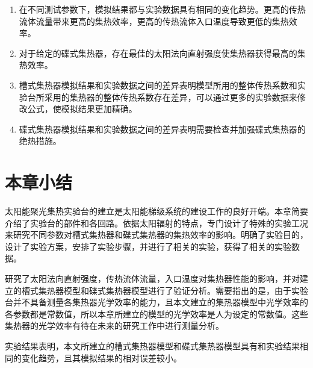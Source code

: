 \begin{enumerate}[label=(\arabic*)]
\item 在不同测试参数下，模拟结果都与实验数据具有相同的变化趋势。更高的传热流体流量带来更高的集热效率，更高的传热流体入口温度导致更低的集热效率。
\item 对于给定的碟式集热器，存在最佳的太阳法向直射强度使集热器获得最高的集热效率。
\item 槽式集热器模拟结果和实验数据之间的差异表明模型所用的整体传热系数和实验台所采用的集热器的整体传热系数存在差异，可以通过更多的实验数据来修改公式，使模拟结果更加精确。
\item 碟式集热器模拟结果和实验数据之间的差异表明需要检查并加强碟式集热器的绝热措施。
\end{enumerate}

\section{本章小结}
太阳能聚光集热实验台的建立是太阳能梯级系统的建设工作的良好开端。本章简要介绍了实验台的部件和各回路。依据太阳辐射的特点，专门设计了特殊的实验工况来研究不同参数对槽式集热器和碟式集热器的集热效率的影响。明确了实验目的，设计了实验方案，安排了实验步骤，并进行了相关的实验，获得了相关的实验数据。

研究了太阳法向直射强度，传热流体流量，入口温度对集热器性能的影响，并对建立的槽式集热器模型和碟式集热器模型进行了验证分析。需要指出的是，由于实验台并不具备测量各集热器光学效率的能力，且本文建立的集热器模型中光学效率的各参数都是常数值，所以本章所建立的模型的光学效率是人为设定的常数值。这些集热器的光学效率有待在未来的研究工作中进行测量分析。

实验结果表明，本文所建立的槽式集热器模型和碟式集热器模型具有和实验结果相同的变化趋势，且其模拟结果的相对误差较小。